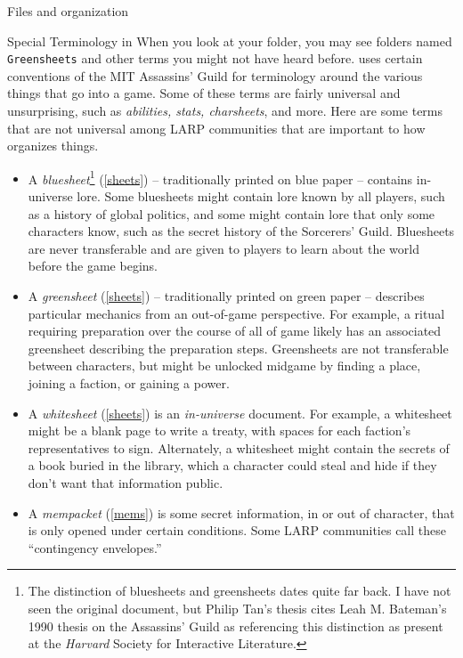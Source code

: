 \documentclass[sheet]{GameTexBase}
\begin{document}
\begin{section}{Files and organization}
\begin{subsection}{Special Terminology in \gametex{}}
When you look at your \gametex{} folder, you may see folders named \texttt{Greensheets} and other terms you might not have heard before.  \gametex{} uses certain conventions of the MIT Assassins' Guild for terminology around the various things that go into a game.  Some of these terms are fairly universal and unsurprising, such as \textit{abilities, stats, charsheets}, and more.  Here are some terms that are not universal among LARP communities that are important to how \gametex{} organizes things.
\begin{itemize}
    \item A \textit{bluesheet}\footnote{The distinction of bluesheets and greensheets dates quite far back.  I have not seen the original document, but Philip Tan's thesis cites Leah M. Bateman's 1990 thesis on the Assassins' Guild as referencing this distinction as present at the \emph{Harvard} Society for Interactive Literature.} (\ref{sheets}) -- traditionally printed on blue paper -- contains in-universe lore.  Some bluesheets might contain lore known by all players, such as a history of global politics, and some might contain lore that only some characters know, such as the secret history of the Sorcerers' Guild.  Bluesheets are never transferable and are given to players to learn about the world before the game begins.
    \item A \textit{greensheet} (\ref{sheets}) -- traditionally printed on green paper -- describes particular mechanics from an out-of-game perspective.  For example, a ritual requiring preparation over the course of all of game likely has an associated greensheet describing the preparation steps.  Greensheets are not transferable between characters, but might be unlocked midgame by finding a place, joining a faction, or gaining a power.
    \item A \textit{whitesheet} (\ref{sheets}) is an \emph{in-universe} document.  For example, a whitesheet might be a blank page to write a treaty, with spaces for each faction's representatives to sign.  Alternately, a whitesheet might contain the secrets of a book buried in the library, which a character could steal and hide if they don't want that information public.
    \item A \textit{mempacket} (\ref{mems}) is some secret information, in or out of character, that is only opened under certain conditions.  Some LARP communities call these ``contingency envelopes.''  

\end{itemize}
\end{subsection}
\end{section}
\end{document}
